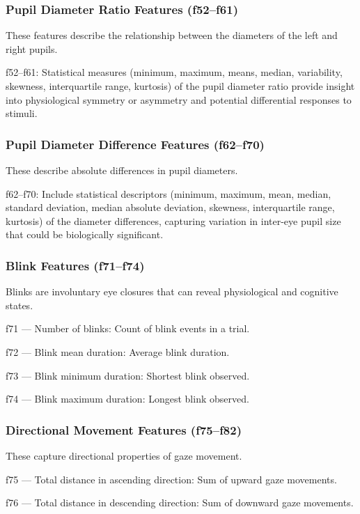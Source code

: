 \documentclass{article}
\begin{document}
\subsubsection{Pupil Diameter Ratio Features (f52–f61)}

These features describe the relationship between the diameters of the left and right pupils.

f52–f61: Statistical measures (minimum, maximum, means, median, variability, skewness, interquartile range, kurtosis) of the pupil diameter ratio provide insight into physiological symmetry or asymmetry and potential differential responses to stimuli.

\subsubsection{Pupil Diameter Difference Features (f62–f70)}

These describe absolute differences in pupil diameters.

f62–f70: Include statistical descriptors (minimum, maximum, mean, median, standard deviation, median absolute deviation, skewness, interquartile range, kurtosis) of the diameter differences, capturing variation in inter-eye pupil size that could be biologically significant.

\subsubsection{Blink Features (f71–f74)}

Blinks are involuntary eye closures that can reveal physiological and cognitive states.

f71 — Number of blinks: Count of blink events in a trial.

f72 — Blink mean duration: Average blink duration.

f73 — Blink minimum duration: Shortest blink observed.

f74 — Blink maximum duration: Longest blink observed.

\subsubsection{Directional Movement Features (f75–f82)}

These capture directional properties of gaze movement.

f75 — Total distance in ascending direction: Sum of upward gaze movements.

f76 — Total distance in descending direction: Sum of downward gaze movements.
\end{document}
